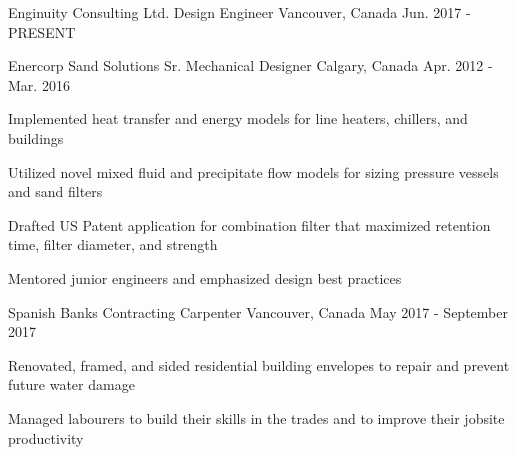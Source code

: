 

\begin{cventries}


  \cventry
    {Enginuity Consulting Ltd.} %
    {Design Engineer} %
    {Vancouver, Canada} %
    {Jun. 2017 - PRESENT} %
    {
      \begin{cvitems} %
        \item {  }
      \end{cvitems}
    }

  \cventry
    {Enercorp Sand Solutions} %
    {Sr. Mechanical Designer} %
    {Calgary, Canada} %
    {Apr. 2012 - Mar. 2016} %
    {
      \begin{cvitems} %
        \item {Implemented heat transfer and energy models for line heaters, chillers, and buildings}
        \item {Utilized novel mixed fluid and precipitate flow models for sizing pressure vessels and sand filters}
        \item {Drafted US Patent application for combination filter that maximized retention time, filter diameter, and strength}
        \item {Mentored junior engineers and emphasized design best practices}
      \end{cvitems}
    }


  \cventry
    {Spanish Banks Contracting} %
    {Carpenter} %
    {Vancouver, Canada} %
    {May 2017 - September 2017} %
    {
      \begin{cvitems} %
        \item {Renovated, framed, and sided residential building envelopes to repair and prevent future water damage}
        \item {Managed labourers to build their skills in the trades and to improve their jobsite productivity}
      \end{cvitems}
    }


\end{cventries}
